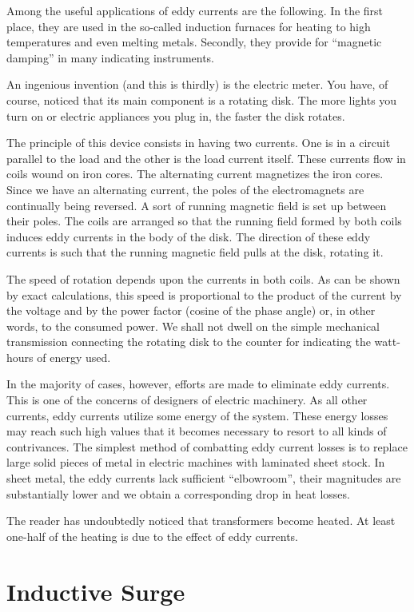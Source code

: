 Among the useful applications of eddy currents are the following. In the first place, they are used in the so-called induction furnaces for heating to high temperatures and even melting metals. Secondly, they provide for ``magnetic damping'' in many indicating instruments.

An ingenious invention (and this is thirdly) is the electric meter. You have, of course, noticed that its main component is a rotating disk. The more lights you turn on or electric appliances you plug in, the faster the disk rotates.

The principle of this device consists in having two currents. One is in a circuit parallel to the load and the other is the load current itself. These currents flow in coils wound on iron cores. The alternating current magnetizes the iron cores. Since we have an alternating current, the poles of the electromagnets are continually being reversed. A sort of running magnetic field is set up between their poles. The coils are arranged so that the running field formed by both coils induces eddy currents in the body of the disk. The direction of these eddy currents is such that the running magnetic field pulls at the disk, rotating it.

The speed of rotation depends upon the currents in both coils. As can be shown by exact calculations, this speed is proportional to the product of the current by the voltage and by the power factor (cosine of the phase angle) or, in other words, to the consumed power. We shall not dwell on the simple mechanical transmission connecting the rotating disk to the counter for indicating the watt-hours of energy used.

In the majority of cases, however, efforts are made to eliminate eddy currents. This is one of the concerns of designers of electric machinery. As all other currents,
eddy currents utilize some energy of the system. These energy losses may reach such high values that it becomes necessary to resort to all kinds of contrivances. The simplest method of combatting eddy current losses is to replace large solid pieces of metal in electric machines with laminated sheet stock. In sheet metal, the eddy currents lack sufficient ``elbowroom'', their magnitudes are substantially lower and we obtain a corresponding drop in heat losses.

The reader has undoubtedly noticed that transformers become heated. At least one-half of the heating is due to the effect of eddy currents.

\section{Inductive Surge}

